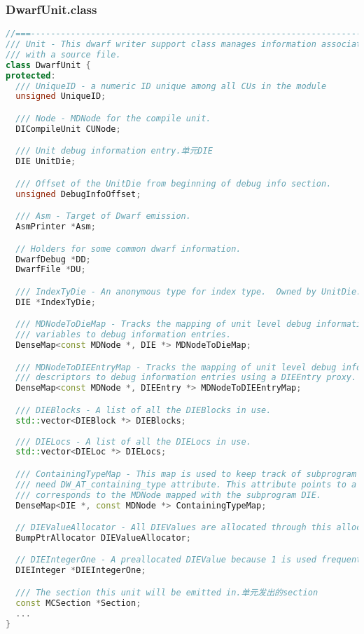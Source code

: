 \documentclass{ctexart}
\begin{document}
\subsubsection{DwarfUnit.class}
\begin{lstlisting}[language=C++]
//===----------------------------------------------------------------------===//
/// Unit - This dwarf writer support class manages information associated
/// with a source file.
class DwarfUnit {
protected:
  /// UniqueID - a numeric ID unique among all CUs in the module
  unsigned UniqueID;

  /// Node - MDNode for the compile unit.
  DICompileUnit CUNode;

  /// Unit debug information entry.单元DIE
  DIE UnitDie;

  /// Offset of the UnitDie from beginning of debug info section.
  unsigned DebugInfoOffset;

  /// Asm - Target of Dwarf emission.
  AsmPrinter *Asm;

  // Holders for some common dwarf information.
  DwarfDebug *DD;
  DwarfFile *DU;

  /// IndexTyDie - An anonymous type for index type.  Owned by UnitDie.
  DIE *IndexTyDie;

  /// MDNodeToDieMap - Tracks the mapping of unit level debug information
  /// variables to debug information entries.
  DenseMap<const MDNode *, DIE *> MDNodeToDieMap;

  /// MDNodeToDIEEntryMap - Tracks the mapping of unit level debug information
  /// descriptors to debug information entries using a DIEEntry proxy.
  DenseMap<const MDNode *, DIEEntry *> MDNodeToDIEEntryMap;

  /// DIEBlocks - A list of all the DIEBlocks in use.
  std::vector<DIEBlock *> DIEBlocks;
  
  /// DIELocs - A list of all the DIELocs in use.
  std::vector<DIELoc *> DIELocs;

  /// ContainingTypeMap - This map is used to keep track of subprogram DIEs that
  /// need DW_AT_containing_type attribute. This attribute points to a DIE that
  /// corresponds to the MDNode mapped with the subprogram DIE.
  DenseMap<DIE *, const MDNode *> ContainingTypeMap;

  // DIEValueAllocator - All DIEValues are allocated through this allocator.
  BumpPtrAllocator DIEValueAllocator;

  // DIEIntegerOne - A preallocated DIEValue because 1 is used frequently.
  DIEInteger *DIEIntegerOne;

  /// The section this unit will be emitted in.单元发出的section
  const MCSection *Section;
  ...
}
\end{lstlisting}
\end{document}
